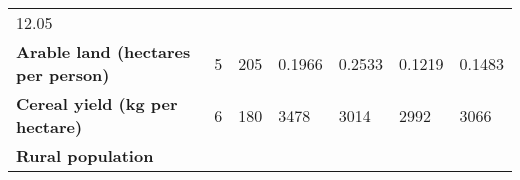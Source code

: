 \documentclass[
]{article}
\begin{document}
\begin{longtable}[]{@{}lllllll@{}}
\begin{minipage}[t]{0.11\columnwidth}
12.05\strut
\end{minipage}\tabularnewline
\begin{minipage}[t]{0.19\columnwidth}\raggedright
\textbf{Arable land (hectares per person)}\strut
\end{minipage} & \begin{minipage}[t]{0.08\columnwidth}\raggedright
5\strut
\end{minipage} & \begin{minipage}[t]{0.07\columnwidth}\raggedright
205\strut
\end{minipage} & \begin{minipage}[t]{0.12\columnwidth}\raggedright
0.1966\strut
\end{minipage} & \begin{minipage}[t]{0.12\columnwidth}\raggedright
0.2533\strut
\end{minipage} & \begin{minipage}[t]{0.11\columnwidth}\raggedright
0.1219\strut
\end{minipage} & \begin{minipage}[t]{0.11\columnwidth}\raggedright
0.1483\strut
\end{minipage}\tabularnewline
\begin{minipage}[t]{0.19\columnwidth}\raggedright
\textbf{Cereal yield (kg per hectare)}\strut
\end{minipage} & \begin{minipage}[t]{0.08\columnwidth}\raggedright
6\strut
\end{minipage} & \begin{minipage}[t]{0.07\columnwidth}\raggedright
180\strut
\end{minipage} & \begin{minipage}[t]{0.12\columnwidth}\raggedright
3478\strut
\end{minipage} & \begin{minipage}[t]{0.12\columnwidth}\raggedright
3014\strut
\end{minipage} & \begin{minipage}[t]{0.11\columnwidth}\raggedright
2992\strut
\end{minipage} & \begin{minipage}[t]{0.11\columnwidth}\raggedright
3066\strut
\end{minipage}\tabularnewline
\begin{minipage}[t]{0.19\columnwidth}\raggedright
\textbf{Rural population}\strut
\end{minipage} & \begin{minipage}[t]{0.08\columnwidth}\raggedright

\end{minipage}
\end{longtable}
\end{document}

